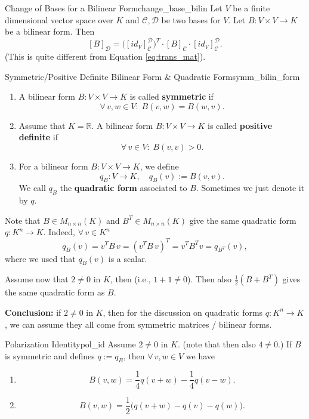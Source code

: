 \begin{lemma}{Change of Bases for a Bilinear Form}{change_base_bilin}
	Let $V$ be a finite dimensional vector space over $K$ and $\mathcal{C}, \mathcal{D}$ be two bases for $V$. Let $B:V \times V \to K$ be a bilinear form. Then
	\[
		[B]_{\mathcal{D}} = \big([id_V]^{\mathcal{D}}_{\mathcal{C}}\big)^T\cdot [B]_{\mathcal{C}} \cdot [id_V]^{\mathcal{D}}_{\mathcal{C}}.
	\]
	(This is quite different from Equation \eqref{eq:trans_mat}). 
\end{lemma}

\begin{definition}{Symmetric/Positive Definite Bilinear Form \& Quadratic Form}{symm_bilin_form}
	\begin{enumerate}
		\item A bilinear form $B:V \times V\to K$ is called \textbf{symmetric} if
		\[
			\forall \, v,w \in V : \; B(v, w) = B(w, v).
		\]
		\item Assume that $K = \mathbb{R}$. A bilinear form $B:V \times V \to K$ is called \textbf{positive definite} if 
		\[
			\forall \, v\in V:\; B(v, v) > 0.
		\]
		\item For a bilinear form $B:V \times V \to K$, we define
		\[
			q_B:V \to K, \quad q_B(v) := B(v, v). 
		\]
		We call $q_B$ the \textbf{quadratic form} associated to $B$. Sometimes we just denote it by $q$.
	\end{enumerate}
\end{definition}

\begin{remark}
	Note that $B \in M_{n\times n}(K)$ and $B^T \in M_{n\times n}(K)$ give the same quadratic form $q:K^n \to K$. Indeed, $\forall \, v\in K^n$
	\[
		q_B(v) = v^T B \, v = (v^T B \, v)^T = v^T B^T v = q_{B^T}(v),
	\]
	where we used that $q_B(v)$ is a scalar.
\end{remark}

Assume now that $2 \neq 0$ in $K$, then (i.e., $1 + 1 \neq 0$). Then also $\tfrac{1}{2}(B + B^T)$ gives the same quadratic form as $B$.

\textbf{Conclusion:} if $2 \neq0$ in $K$, then for the discussion on quadratic forms $q:K^n \to K$, we can assume they all come from symmetric matrices / bilinear forms.

\begin{proposition}{Polarization Identity}{pol_id}
	Assume $2 \neq 0$ in $K$. (note that then also $4 \neq 0$.) If $B$ is symmetric and defines $q := q_B$, then $\forall \, v, w \in V$ we have
	\begin{enumerate}
		\item 
		\[
			B(v, w) = \frac{1}{4} q(v + w) - \frac{1}{4} q(v - w).
		\]
		\item 
		\[
			B(v, w) = \frac{1}{2}\big(q(v + w) - q(v) - q(w)\big).	
		\]
	\end{enumerate}
\end{proposition}


